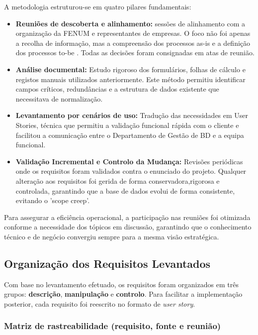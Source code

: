 \documentclass[12pt,a4paper]{article}
\begin{document}
A metodologia estruturou-se em quatro pilares fundamentais:

\begin{itemize}[leftmargin=1.5cm]
    \item \textbf{Reuniões de descoberta e alinhamento:} sessões de alinhamento
    com a organização da FENUM e representantes de empresas. O foco não foi
    apenas a recolha de informação, mas a compreensão dos processos as-is e a
    definição dos processos to-be . Todas as decisões foram consignadas em atas
    de reunião.
    \item \textbf{Análise documental:} Estudo rigoroso dos formulários, folhas
    de cálculo e registos manuais utilizados anteriormente. Este método permitiu
    identificar campos críticos, redundâncias e a estrutura de dados existente
    que necessitava de normalização.
    \item \textbf{Levantamento por cenários de uso:} Tradução das necessidades
    em User Stories, técnica que permitiu a validação funcional rápida com o
    cliente e facilitou a comunicação entre o Departamento de Gestão de BD e a
    equipa funcional.
    \item \textbf{Validação Incremental e Controlo da Mudança:} Revisões
    periódicas onde os requisitos foram validados contra o enunciado do projeto.
    Qualquer alteração aos requisitos foi gerida de forma conservadora,rigorosa e controlada, garantindo
    que a base de dados evolui de forma consistente, evitando o 'scope creep'.
\end{itemize}

Para assegurar a eficiência operacional, a participação nas reuniões foi
otimizada conforme a necessidade dos tópicos em discussão, garantindo que o
conhecimento técnico e de negócio convergiu sempre para a mesma visão
estratégica.
\subsection{Organização dos Requisitos Levantados}

Com base no levantamento efetuado, os requisitos foram organizados em três
grupos: \textbf{descrição}, \textbf{manipulação} e \textbf{controlo}. Para
facilitar a implementação posterior, cada requisito foi reescrito no formato de
\textit{user story}.

\subsubsection{Matriz de rastreabilidade (requisito, fonte e reunião)}
\end{document}
